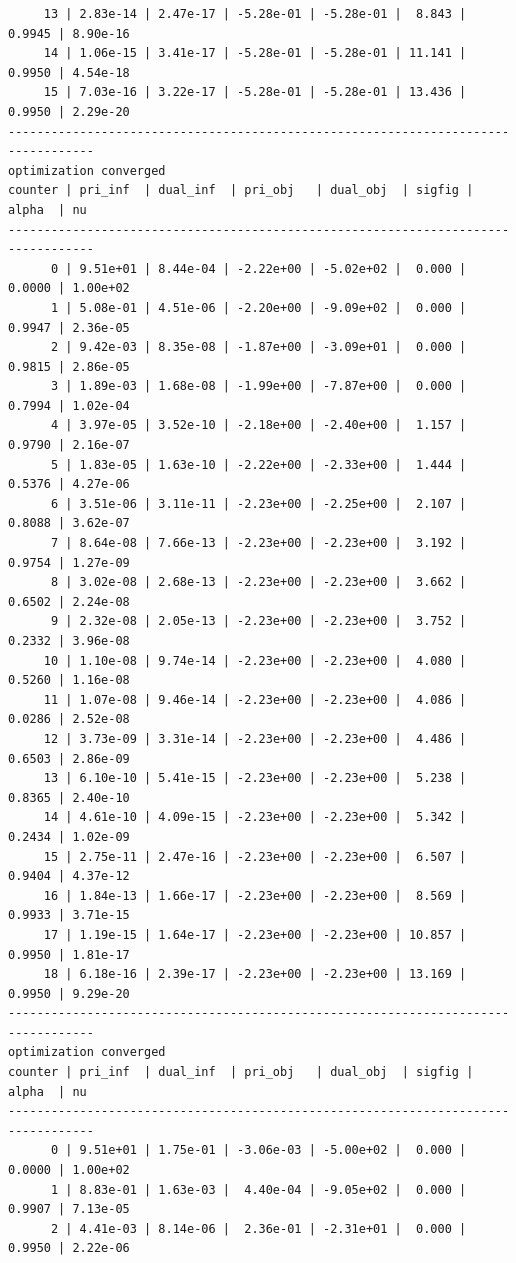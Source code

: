 \documentclass[
]{book}
\begin{document}
\begin{verbatim}
     13 | 2.83e-14 | 2.47e-17 | -5.28e-01 | -5.28e-01 |  8.843 | 0.9945 | 8.90e-16
     14 | 1.06e-15 | 3.41e-17 | -5.28e-01 | -5.28e-01 | 11.141 | 0.9950 | 4.54e-18
     15 | 7.03e-16 | 3.22e-17 | -5.28e-01 | -5.28e-01 | 13.436 | 0.9950 | 2.29e-20
----------------------------------------------------------------------------------
optimization converged
counter | pri_inf  | dual_inf  | pri_obj   | dual_obj  | sigfig | alpha  | nu 
----------------------------------------------------------------------------------
      0 | 9.51e+01 | 8.44e-04 | -2.22e+00 | -5.02e+02 |  0.000 | 0.0000 | 1.00e+02
      1 | 5.08e-01 | 4.51e-06 | -2.20e+00 | -9.09e+02 |  0.000 | 0.9947 | 2.36e-05
      2 | 9.42e-03 | 8.35e-08 | -1.87e+00 | -3.09e+01 |  0.000 | 0.9815 | 2.86e-05
      3 | 1.89e-03 | 1.68e-08 | -1.99e+00 | -7.87e+00 |  0.000 | 0.7994 | 1.02e-04
      4 | 3.97e-05 | 3.52e-10 | -2.18e+00 | -2.40e+00 |  1.157 | 0.9790 | 2.16e-07
      5 | 1.83e-05 | 1.63e-10 | -2.22e+00 | -2.33e+00 |  1.444 | 0.5376 | 4.27e-06
      6 | 3.51e-06 | 3.11e-11 | -2.23e+00 | -2.25e+00 |  2.107 | 0.8088 | 3.62e-07
      7 | 8.64e-08 | 7.66e-13 | -2.23e+00 | -2.23e+00 |  3.192 | 0.9754 | 1.27e-09
      8 | 3.02e-08 | 2.68e-13 | -2.23e+00 | -2.23e+00 |  3.662 | 0.6502 | 2.24e-08
      9 | 2.32e-08 | 2.05e-13 | -2.23e+00 | -2.23e+00 |  3.752 | 0.2332 | 3.96e-08
     10 | 1.10e-08 | 9.74e-14 | -2.23e+00 | -2.23e+00 |  4.080 | 0.5260 | 1.16e-08
     11 | 1.07e-08 | 9.46e-14 | -2.23e+00 | -2.23e+00 |  4.086 | 0.0286 | 2.52e-08
     12 | 3.73e-09 | 3.31e-14 | -2.23e+00 | -2.23e+00 |  4.486 | 0.6503 | 2.86e-09
     13 | 6.10e-10 | 5.41e-15 | -2.23e+00 | -2.23e+00 |  5.238 | 0.8365 | 2.40e-10
     14 | 4.61e-10 | 4.09e-15 | -2.23e+00 | -2.23e+00 |  5.342 | 0.2434 | 1.02e-09
     15 | 2.75e-11 | 2.47e-16 | -2.23e+00 | -2.23e+00 |  6.507 | 0.9404 | 4.37e-12
     16 | 1.84e-13 | 1.66e-17 | -2.23e+00 | -2.23e+00 |  8.569 | 0.9933 | 3.71e-15
     17 | 1.19e-15 | 1.64e-17 | -2.23e+00 | -2.23e+00 | 10.857 | 0.9950 | 1.81e-17
     18 | 6.18e-16 | 2.39e-17 | -2.23e+00 | -2.23e+00 | 13.169 | 0.9950 | 9.29e-20
----------------------------------------------------------------------------------
optimization converged
counter | pri_inf  | dual_inf  | pri_obj   | dual_obj  | sigfig | alpha  | nu 
----------------------------------------------------------------------------------
      0 | 9.51e+01 | 1.75e-01 | -3.06e-03 | -5.00e+02 |  0.000 | 0.0000 | 1.00e+02
      1 | 8.83e-01 | 1.63e-03 |  4.40e-04 | -9.05e+02 |  0.000 | 0.9907 | 7.13e-05
      2 | 4.41e-03 | 8.14e-06 |  2.36e-01 | -2.31e+01 |  0.000 | 0.9950 | 2.22e-06

\end{verbatim}
\end{document}
